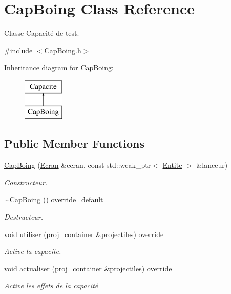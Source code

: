 \hypertarget{class_cap_boing}{}\section{Cap\+Boing Class Reference}
\label{class_cap_boing}


Classe Capacité de test.  




{\ttfamily \#include $<$Cap\+Boing.\+h$>$}

Inheritance diagram for Cap\+Boing\+:\begin{figure}[H]
\begin{center}
\leavevmode
\includegraphics[height=2.000000cm]{class_cap_boing}
\end{center}
\end{figure}
\subsection*{Public Member Functions}
\begin{DoxyCompactItemize}
\item 
\mbox{\hyperlink{class_cap_boing_a9d315f24e4dfa2406956a9c53624d2ec}{Cap\+Boing}} (\mbox{\hyperlink{class_ecran}{Ecran}} \&ecran, const std\+::weak\+\_\+ptr$<$ \mbox{\hyperlink{class_entite}{Entite}} $>$ \&lanceur)
\begin{DoxyCompactList}\small\item\em Constructeur. \end{DoxyCompactList}\item 
\mbox{\hyperlink{class_cap_boing_a7f90c88c46fa87ff4c0fb66708648f96}{$\sim$\+Cap\+Boing}} () override=default
\begin{DoxyCompactList}\small\item\em Destructeur. \end{DoxyCompactList}\item 
void \mbox{\hyperlink{class_cap_boing_a879dfeba930a0be60873ef3403a35eb1}{utiliser}} (\mbox{\hyperlink{def__type_8h_a87980cd8ee9533e561a73e8bbc728188}{proj\+\_\+container}} \&projectiles) override
\begin{DoxyCompactList}\small\item\em Active la capacite. \end{DoxyCompactList}\item 
void \mbox{\hyperlink{class_cap_boing_a2bf6f58f93ff52263cf9926e4d91c239}{actualiser}} (\mbox{\hyperlink{def__type_8h_a87980cd8ee9533e561a73e8bbc728188}{proj\+\_\+container}} \&projectiles) override
\begin{DoxyCompactList}\small\item\em Active les effets de la capacité \end{DoxyCompactList}\end{DoxyCompactItemize}
